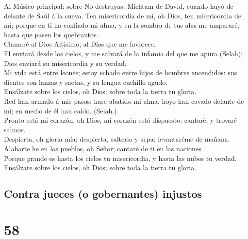  Al Músico principal: sobre No destruyas: Michtam de
David, cuando huyó de delante de Saúl á la cueva. Ten misericordia de
mí, oh Dios, ten misericordia de mí; porque en ti ha confiado mi alma, y
en la sombra de tus alas me ampararé, hasta que pasen los quebrantos.\\
 Clamaré al Dios Altísimo, al Dios que me favorece.\\
 El enviará desde los cielos, y me salvará de la infamia
del que me apura (Selah); Dios enviará su misericordia y su verdad.\\
 Mi vida está entre leones; estoy echado entre hijos de
hombres encendidos: sus dientes son lanzas y saetas, y su lengua
cuchillo agudo.\\
 Ensálzate sobre los cielos, oh Dios; sobre toda la tierra
tu gloria.\\
 Red han armado á mis pasos; hase abatido mi alma: hoyo
han cavado delante de mí; en medio de él han caído. (Selah.)\\
 Pronto está mi corazón, oh Dios, mi corazón está
dispuesto: cantaré, y trovaré salmos.\\
 Despierta, oh gloria mía; despierta, salterio y arpa:
levantaréme de mañana.\\
 Alabarte he en los pueblos, oh Señor; cantaré de ti en
las naciones.\\
 Porque grande es hasta los cielos tu misericordia, y
hasta las nubes tu verdad.\\
 Ensálzate sobre los cielos, oh Dios; sobre toda la
tierra tu gloria.

\hypertarget{contra-jueces-o-gobernantes-injustos}{%
\subsection{Contra jueces (o gobernantes)
injustos}\label{contra-jueces-o-gobernantes-injustos}}

\hypertarget{section-57}{%
\section{58}\label{section-57}}

